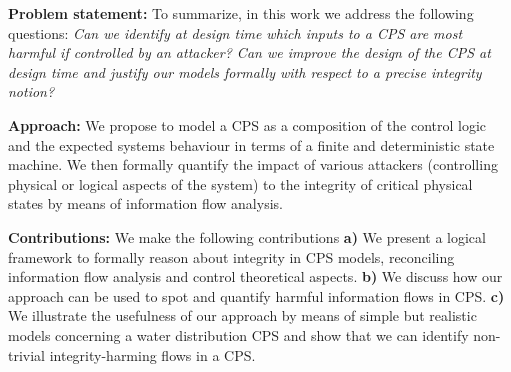 
% 
{\color{red}
\textbf{Problem statement:} To summarize, in this work we address the following
questions: \emph{Can we identify at design time which inputs to a CPS are most
harmful if controlled by an attacker? Can we improve the design of the CPS
at design time and justify our models formally with respect to a precise
integrity notion?}

\textbf{Approach:} We propose to model a CPS as a composition of the control
logic and the expected systems behaviour in terms of a finite and deterministic
state machine. We then formally quantify the impact of various attackers
(controlling physical or logical aspects of the system) to the integrity
of critical physical states by means of information flow analysis.

\textbf{Contributions:} We make the following contributions \textbf{a)} We present a logical framework to formally reason about integrity in CPS models,
reconciling information flow analysis and control theoretical aspects. \textbf{b)} We discuss how our approach can be used to spot and quantify harmful information flows in CPS. \textbf{c)} We illustrate the usefulness of
our approach by means of simple but realistic models concerning a water
distribution CPS and show that we can identify non-trivial integrity-harming flows
in a CPS.
}
